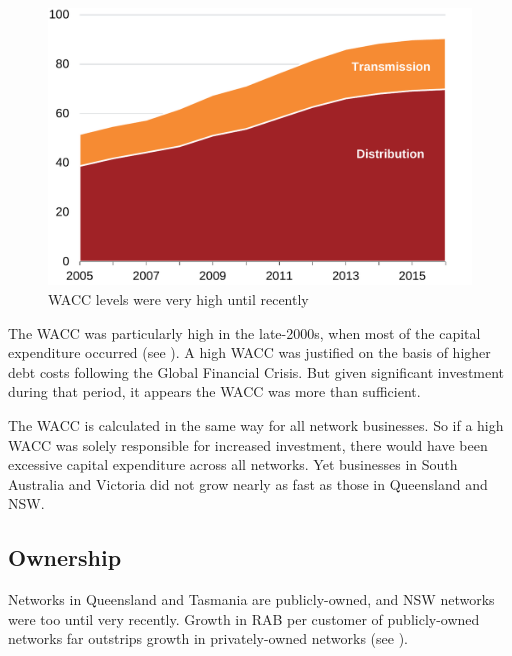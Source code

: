 \documentclass[FrontPage]{grattan}
\begin{document}
\begin{figure}
\caption{WACC levels were very high until recently}\label{fig:WACC-high-until-recently}
\units{}
\includegraphics[page=8]{atlas/Charts.pdf}
\end{figure}

The WACC was particularly high in the late-2000s, when most of the capital expenditure occurred (see ). A high WACC was justified on the basis of higher debt costs following the Global Financial Crisis. But given significant investment during that period, it appears the WACC was more than sufficient. 

The WACC is calculated in the same way for all network businesses. So if a high WACC was solely responsible for increased investment, there would have been excessive capital expenditure across all networks. Yet businesses in South Australia and Victoria did not grow nearly as fast as those in Queensland and NSW\@.

\subsection{Ownership}\label{subsubsec:incentive-structure-plus-ownership}
Networks in Queensland and Tasmania are publicly-owned, and NSW networks were too until very recently. Growth in RAB per customer of publicly-owned networks far outstrips growth in privately-owned networks (see ).
\end{document}
